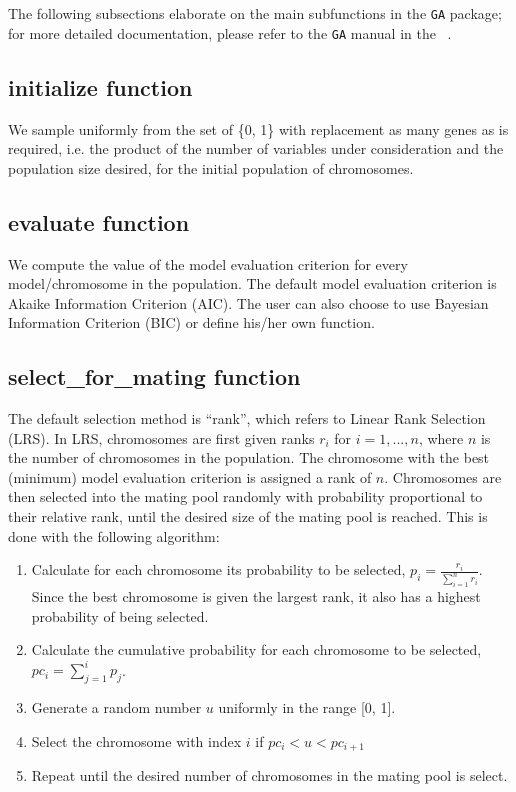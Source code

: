 \documentclass[11pt]{article}
\begin{document}
The following subsections elaborate on the main subfunctions in the \texttt{GA} package; for more detailed documentation, please refer to the \texttt{GA} manual in the ~.

\subsection*{initialize function}
We sample uniformly from the set of \{0, 1\} with replacement as many genes as is required, i.e. the product of the number of variables under consideration and the population size desired, for the initial population of chromosomes.

\subsection*{evaluate function}
We compute the value of the model evaluation criterion for every model/chromosome in the population. The default model evaluation criterion is Akaike Information Criterion (AIC). The user can also choose to use Bayesian Information Criterion (BIC) or define his/her own function.

\subsection*{select\_for\_mating function}
The default selection method is ``rank'', which refers to Linear Rank Selection (LRS). In LRS, chromosomes are first given ranks $r_i$ for $i = 1, ..., n$, where $n$ is the number of chromosomes in the population. The chromosome with the best (minimum) model evaluation criterion is assigned a rank of $n$. Chromosomes are then selected into the mating pool randomly with probability proportional to their relative rank, until the desired size of the mating pool is reached. This is done with the following algorithm:
\begin{enumerate}
\item Calculate for each chromosome its probability to be selected, $p_i = \frac{r_i}{\sum\limits_{i=1}^n{r_i}}$. Since the best chromosome is given the largest rank, it also has a highest probability of being selected.
\item Calculate the cumulative probability for each chromosome to be selected, $pc_i = \sum\limits_{j=1}^i{p_j}$.
\item Generate a random number $u$ uniformly in the range [0, 1].
\item Select the chromosome with index $i$ if $pc_i < u < pc_{i+1}$
\item Repeat until the desired number of chromosomes in the mating pool is select.
\end{enumerate}
\end{document}
